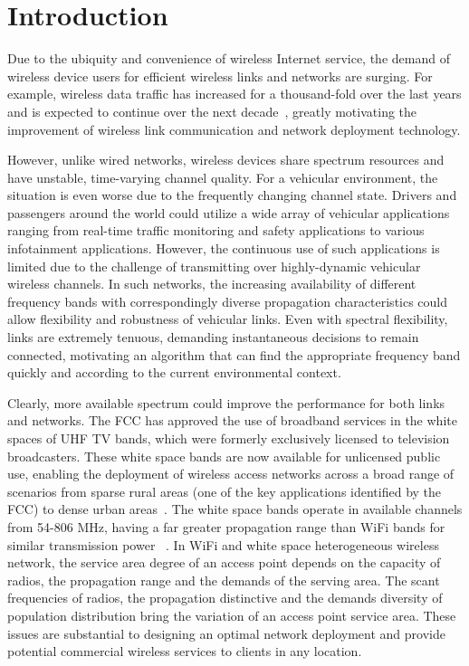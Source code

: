 \chapter{Introduction} \label{ch:introduction}



Due to the ubiquity and convenience of wireless Internet service, the demand of 
wireless device users for efficient wireless links and networks are surging.
For example, wireless 
data traffic has increased for a thousand-fold over the last years and is 
expected to continue over the next decade~\cite{metis}, greatly motivating 
the improvement of wireless link communication and network deployment technology.

However, unlike wired networks, wireless devices share spectrum resources 
and have unstable, time-varying channel quality. For a vehicular
environment, the situation is even worse due to the frequently changing channel 
state. Drivers and passengers around the world could utilize a 
wide array of vehicular applications ranging from real-time traffic 
monitoring and safety applications to various infotainment applications.
However, the continuous use of such applications is limited due to the
challenge of transmitting over highly-dynamic vehicular wireless channels.
In such networks, the increasing availability of different frequency bands 
with correspondingly diverse propagation characteristics could allow flexibility 
and robustness of vehicular links. Even with spectral flexibility, links are 
extremely tenuous, demanding instantaneous decisions to remain connected, 
motivating an algorithm that can find the appropriate frequency band quickly 
and according to the current environmental context.

Clearly, more available spectrum could improve the performance for 
both links and networks. The FCC has approved the use of broadband 
services in the white spaces of UHF TV bands, which were formerly exclusively 
licensed to television broadcasters. These white space bands are now available 
for unlicensed public use, enabling the deployment of wireless access networks 
across a broad range of scenarios from sparse rural areas (one of the key 
applications identified by the FCC) to dense urban areas~\cite{carlson}. The 
white space bands operate in available channels from 54-806 MHz, having a far 
greater propagation range than WiFi bands for similar transmission power
~\cite{balanis2012antenna}. In WiFi and white space heterogeneous wireless 
network, the service area degree of an access point depends on the capacity 
of radios, the propagation range and the demands of the serving area. The scant 
frequencies of radios, the propagation distinctive and the demands diversity 
of population distribution bring the variation of an access point service area. 
These issues are substantial to designing an optimal network deployment and 
provide potential commercial wireless services to clients in any location.

